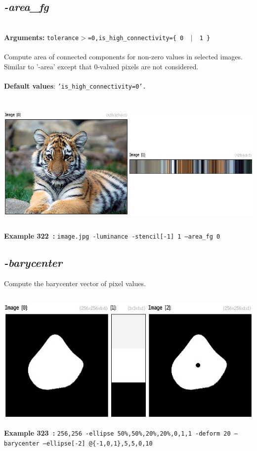 \documentclass[a4paper,11pt,twoside]{book}
\begin{document}
\subsection{\emph{-area\_fg} }\vspace*{-0.5em}
~\\\textbf{Arguments: } 
{\small \texttt{tolerance$>$=0,is\_high\_connectivity=\{ 0 ~$|$~ 1 \}}}\\~\\
Compute area of connected components for non-zero values in selected images.
~\\Similar to '-area' except that 0-valued pixels are not considered.
~\\~\\\textbf{Default values}: {\small \texttt{'is\_high\_connectivity=0'.}}
\begin{center}\includegraphics[keepaspectratio=true,height=7cm,width=\textwidth]{img/gmic_def322.jpg}\\
{\footnotesize \textbf{Example 322~:} \texttt{image.jpg -luminance -stencil[-1] 1 --area\_fg 0}}
\end{center}

\subsection{\emph{-barycenter} }\vspace*{-0.5em}
Compute the barycenter vector of pixel values.
\begin{center}\includegraphics[keepaspectratio=true,height=7cm,width=\textwidth]{img/gmic_def323.jpg}\\
{\footnotesize \textbf{Example 323~:} \texttt{256,256 -ellipse 50\%,50\%,20\%,20\%,0,1,1 -deform 20 --barycenter --ellipse[-2] @\{-1,0,1\},5,5,0,10}}
\end{center}
\end{document}
